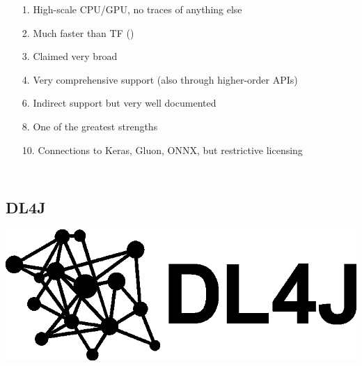 \documentclass[hyperref={pdfpagelabels=false}]{beamer}
\begin{document}
\begin{frame}
\begin{columns}[t]
\begin{tikzpicture}
         \end{tikzpicture}
         \begin{itemize}
         \item[\scriptsize{\textcolor{visiblered}{1.}}] \scriptsize{High-scale CPU/GPU, no traces of anything else}
         \item[\scriptsize{\textcolor{visiblered}{2.}}] \scriptsize{Much faster than TF (\cite{chainer-benchmarks})}
         \item[\scriptsize{\textcolor{visiblegreen}{3.}}] \scriptsize{Claimed very broad\cite{cntk-web}}
         \item[\scriptsize{\textcolor{visiblegreen}{4.}}] \scriptsize{Very comprehensive support (also through higher-order APIs)}
         \item[\scriptsize{\textcolor{visiblegreen}{6.}}] \scriptsize{Indirect support but very well documented}
         \item[\scriptsize{\textcolor{visibleblue}{8.}}] \scriptsize{One of the greatest strengths}
         \item[\scriptsize{\textcolor{visibleblue}{10.}}] \scriptsize{Connections to Keras, Gluon, ONNX, but restrictive licensing}
         \end{itemize}
          \end{columns}
     \end{frame}


     \subsection{DL4J} %
     \begin{frame}[c] %
       \begin{center}
         \vspace{8mm}
         \includegraphics[scale=0.17]{logo_dl4j.png}
       \end{center}
     \end{frame}
     
\end{document}
